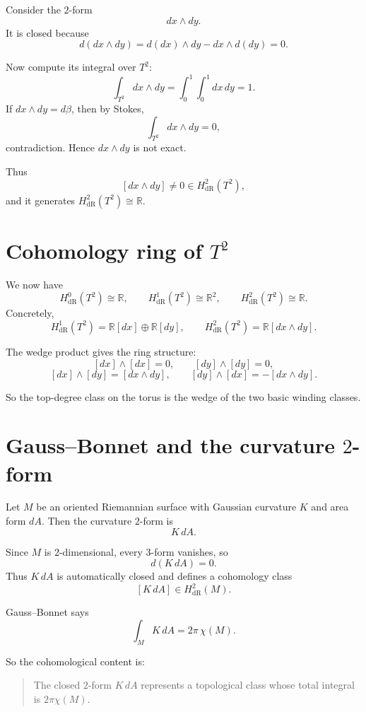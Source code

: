 \documentclass[11pt]{article}
\begin{document}
	Consider the \(2\)-form
	\[
	dx\wedge dy.
	\]
	It is closed because
	\[
	d(dx\wedge dy)=d(dx)\wedge dy-dx\wedge d(dy)=0.
	\]
	
	Now compute its integral over \(T^2\):
	\[
	\int_{T^2}dx\wedge dy
	=
	\int_0^1\int_0^1 dx\,dy
	=
	1.
	\]
	If \(dx\wedge dy=d\beta\), then by Stokes,
	\[
	\int_{T^2}dx\wedge dy=0,
	\]
	contradiction. Hence \(dx\wedge dy\) is not exact.
	
	Thus
	\[
	[dx\wedge dy]\neq 0\in H^2_{\mathrm{dR}}(T^2),
	\]
	and it generates \(H^2_{\mathrm{dR}}(T^2)\cong\mathbb{R}\).
	
	\section{Cohomology ring of \(T^2\)}
	
	We now have
	\[
	H^0_{\mathrm{dR}}(T^2)\cong \mathbb{R},\qquad
	H^1_{\mathrm{dR}}(T^2)\cong \mathbb{R}^2,\qquad
	H^2_{\mathrm{dR}}(T^2)\cong \mathbb{R}.
	\]
	Concretely,
	\[
	H^1_{\mathrm{dR}}(T^2)=\mathbb{R}[dx]\oplus\mathbb{R}[dy],
	\qquad
	H^2_{\mathrm{dR}}(T^2)=\mathbb{R}[dx\wedge dy].
	\]
	
	The wedge product gives the ring structure:
	\[
	[dx]\wedge[dx]=0,\qquad [dy]\wedge[dy]=0,
	\]
	\[
	[dx]\wedge[dy]=[dx\wedge dy],
	\qquad
	[dy]\wedge[dx]=-[dx\wedge dy].
	\]
	
	So the top-degree class on the torus is the wedge of the two basic winding classes.
	
	\section{Gauss--Bonnet and the curvature \(2\)-form}
	
	Let \(M\) be an oriented Riemannian surface with Gaussian curvature \(K\) and area form \(dA\). Then the curvature \(2\)-form is
	\[
	K\,dA.
	\]
	
	Since \(M\) is \(2\)-dimensional, every \(3\)-form vanishes, so
	\[
	d(K\,dA)=0.
	\]
	Thus \(K\,dA\) is automatically closed and defines a cohomology class
	\[
	[K\,dA]\in H^2_{\mathrm{dR}}(M).
	\]
	
	Gauss--Bonnet says
	\[
	\int_M K\,dA = 2\pi\,\chi(M).
	\]
	
	So the cohomological content is:
	\begin{quote}
		The closed \(2\)-form \(K\,dA\) represents a topological class whose total integral is \(2\pi\chi(M)\).
	\end{quote}
	
\end{document}
